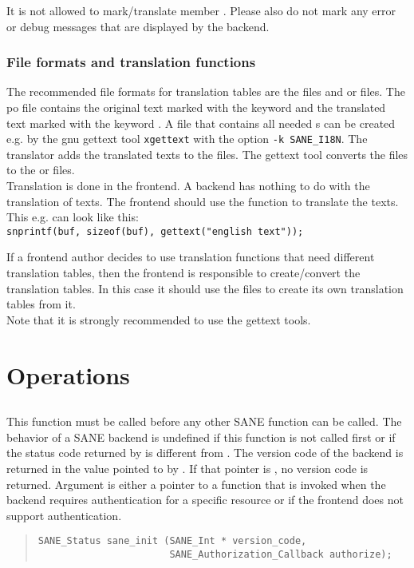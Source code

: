 \documentclass[11pt,DVIps]{report}
\begin{document}
\begin{changebar}
It is not allowed to mark/translate member .
Please also do not mark any error or debug messages that are
displayed by the backend.

\subsubsection{File formats and translation functions}
The recommended file formats for translation tables are the  files
and  or  files.
The po file contains the original text marked with the keyword 
and the translated text marked with the keyword .
A  file that contains all needed s can be created
e.g. by the gnu gettext tool \verb|xgettext| with the option
\verb|-k SANE_I18N|.
The translator adds the translated texts to the  files.
The gettext tool  converts the  files to the
 or  files.\\

Translation is done in the frontend. A backend has nothing
to do with the translation of texts.
The frontend should use the function 
to translate the texts. This e.g. can look like this:\\
\verb|snprintf(buf, sizeof(buf), gettext("english text"));|

If a frontend author decides to use translation functions that
need different translation tables, then the frontend is
responsible to create/convert the translation tables.
In this case it should use the  files to create its
own translation tables from it.\\

Note that it is strongly recommended to use the gettext tools.
\end{changebar}


\section{Operations}

\subsection{}

This function must be called before any other SANE function can be called.
The behavior of a SANE backend is undefined if this function is not called
first or if the status code returned by  is different from
.  The version code of the backend is returned
in the value pointed to by .  If that pointer is
, no version code is returned.  Argument  is either
a pointer to a function that is invoked when the backend requires
authentication for a specific resource or  if the frontend does not
support authentication.
\begin{quote}
\begin{verbatim}
SANE_Status sane_init (SANE_Int * version_code,
                       SANE_Authorization_Callback authorize);
\end{verbatim}
\end{quote}
\end{document}
